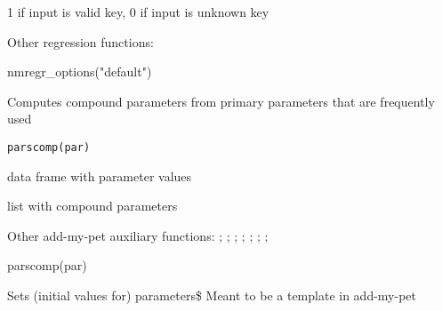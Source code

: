 \documentclass[a4paper]{book}
\begin{document}
%
\begin{Value}
1 if input is valid key, 0 if input is unknown key
\end{Value}
%
\begin{SeeAlso}\relax
Other regression functions: 
\end{SeeAlso}
%
\begin{Examples}
\begin{ExampleCode}
nmregr_options("default")
\end{ExampleCode}
\end{Examples}
%
\begin{Description}\relax
Computes compound parameters from primary parameters that are frequently used
\end{Description}
%
\begin{Usage}
\begin{verbatim}
parscomp(par)
\end{verbatim}
\end{Usage}
%
\begin{Arguments}
\begin{ldescription}
\item[\code{par}] data frame with parameter values
\end{ldescription}
\end{Arguments}
%
\begin{Value}
list with compound parameters
\end{Value}
%
\begin{SeeAlso}\relax
Other add-my-pet auxiliary functions: ;
; ;
; ;
;
; 
\end{SeeAlso}
%
\begin{Examples}
\begin{ExampleCode}
parscomp(par)
\end{ExampleCode}
\end{Examples}
%
\begin{Description}\relax
Sets (initial values for) parameters\$ Meant to be a template in add-my-pet
\end{Description}
\end{document}

